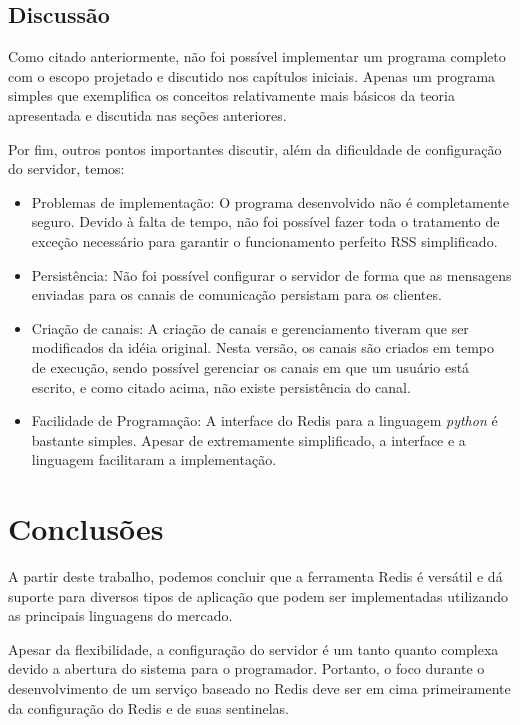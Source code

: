 \documentclass[10pt]{IEEEtran}
\begin{document}
\subsection{Discussão}

Como citado anteriormente, não foi possível implementar um programa completo com o escopo projetado e discutido nos capítulos iniciais. Apenas um programa simples que exemplifica os conceitos relativamente mais básicos da teoria apresentada e discutida nas seções anteriores.

Por fim, outros pontos importantes discutir, além da dificuldade de configuração do servidor, temos:

\begin{itemize}
\item Problemas de implementação: O programa desenvolvido não é completamente seguro. Devido à falta de tempo, não foi possível fazer toda o tratamento de exceção necessário para garantir o funcionamento perfeito RSS simplificado.
\item Persistência: Não foi possível configurar o servidor de forma que as mensagens enviadas para os canais de comunicação persistam para os clientes.
\item Criação de canais: A criação de canais e gerenciamento tiveram que ser modificados da idéia original. Nesta versão, os canais são criados em tempo de execução, sendo possível gerenciar os canais em que um usuário está escrito, e como citado acima, não existe persistência do canal.
\item Facilidade de Programação: A interface do Redis para a linguagem \textit{python} é bastante simples. Apesar de extremamente simplificado, a interface e a linguagem facilitaram a implementação.
\end{itemize}

\section{Conclusões}

A partir deste trabalho, podemos concluir que a ferramenta Redis é versátil e dá suporte para diversos tipos de aplicação que podem ser implementadas utilizando as principais linguagens do mercado.

Apesar da flexibilidade, a configuração do servidor é um tanto quanto complexa devido a abertura do sistema para o programador. Portanto, o foco durante o desenvolvimento de um serviço baseado no Redis deve ser em cima primeiramente da configuração do Redis e de suas sentinelas.

\nocite{*}
  


\end{document}
